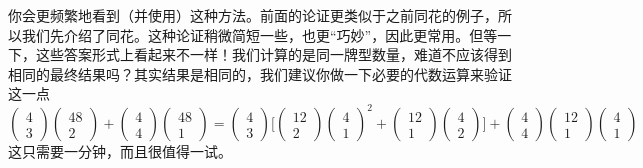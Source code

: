 \begin{example}[至少三张 $A$]
    你会更频繁地看到（并使用）这种方法。前面的论证更类似于之前同花的例子，所以我们先介绍了同花。这种论证稍微简短一些，也更``巧妙''，因此更常用。但等一下，这些答案形式上看起来不一样！我们计算的是同一牌型数量，难道不应该得到相同的最终结果吗？其实结果是相同的，我们建议你做一下必要的代数运算来验证这一点
    \[\begin{pmatrix}
            4 \\
            3
        \end{pmatrix}\begin{pmatrix}
            48 \\
            2
        \end{pmatrix}+\begin{pmatrix}
            4 \\
            4
        \end{pmatrix}\begin{pmatrix}
            48 \\
            1
        \end{pmatrix} = \begin{pmatrix}
            4 \\
            3
        \end{pmatrix}\Bigg[\begin{pmatrix}
                12 \\
                2
            \end{pmatrix} \begin{pmatrix}
                4 \\
                1
            \end{pmatrix}^2 + \begin{pmatrix}
                12 \\
                1
            \end{pmatrix} \begin{pmatrix}
                4 \\
                2
            \end{pmatrix}\Bigg] + \begin{pmatrix}
            4 \\
            4
        \end{pmatrix}\begin{pmatrix}
            12 \\
            1
        \end{pmatrix}\begin{pmatrix}
            4 \\
            1
        \end{pmatrix}\]
    这只需要一分钟，而且很值得一试。
\end{example}

